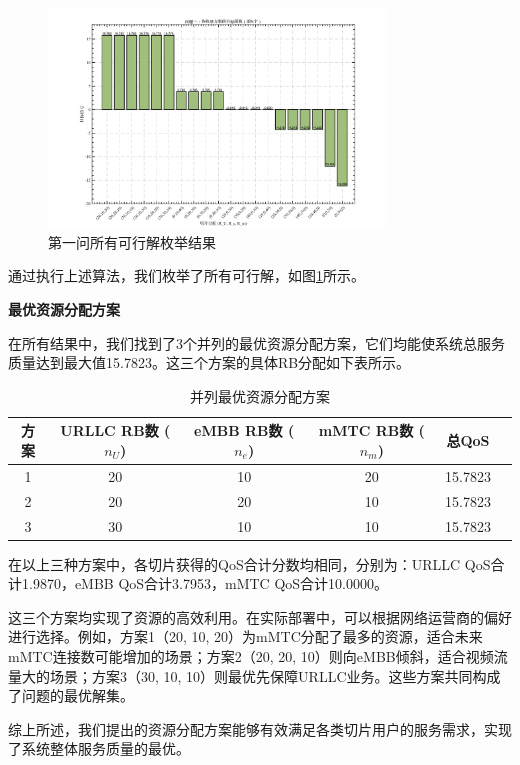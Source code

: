 \begin{figure}[H]
    \centering
    \includegraphics[width=0.8\textwidth]{figures/q1求解结果.pdf}
    \caption{第一问所有可行解枚举结果}
    \label{fig:q1_result}
\end{figure}
通过执行上述算法，我们枚举了所有可行解，如图\ref{fig:q1_result}所示。

\textbf{最优资源分配方案}

在所有结果中，我们找到了3个并列的最优资源分配方案，它们均能使系统总服务质量达到最大值15.7823。这三个方案的具体RB分配如下表所示。

\begin{table}[H]
\centering
\caption{并列最优资源分配方案}
\label{tab:q1_best_solutions}
\begin{tabular}{cccccc}
\hline
\textbf{方案} & \textbf{URLLC RB数 ($n_U$)} & \textbf{eMBB RB数 ($n_e$)} & \textbf{mMTC RB数 ($n_m$)} & \textbf{总QoS} \\
\hline
1 & 20 & 10 & 20 & 15.7823 \\
2 & 20 & 20 & 10 & 15.7823 \\
3 & 30 & 10 & 10 & 15.7823 \\
\hline
\end{tabular}
\end{table}

在以上三种方案中，各切片获得的QoS合计分数均相同，分别为：URLLC QoS合计1.9870，eMBB QoS合计3.7953，mMTC QoS合计10.0000。

 这三个方案均实现了资源的高效利用。在实际部署中，可以根据网络运营商的偏好进行选择。例如，方案1（20, 10, 20）为mMTC分配了最多的资源，适合未来mMTC连接数可能增加的场景；方案2（20, 20, 10）则向eMBB倾斜，适合视频流量大的场景；方案3（30, 10, 10）则最优先保障URLLC业务。这些方案共同构成了问题的最优解集。


综上所述，我们提出的资源分配方案能够有效满足各类切片用户的服务需求，实现了系统整体服务质量的最优。